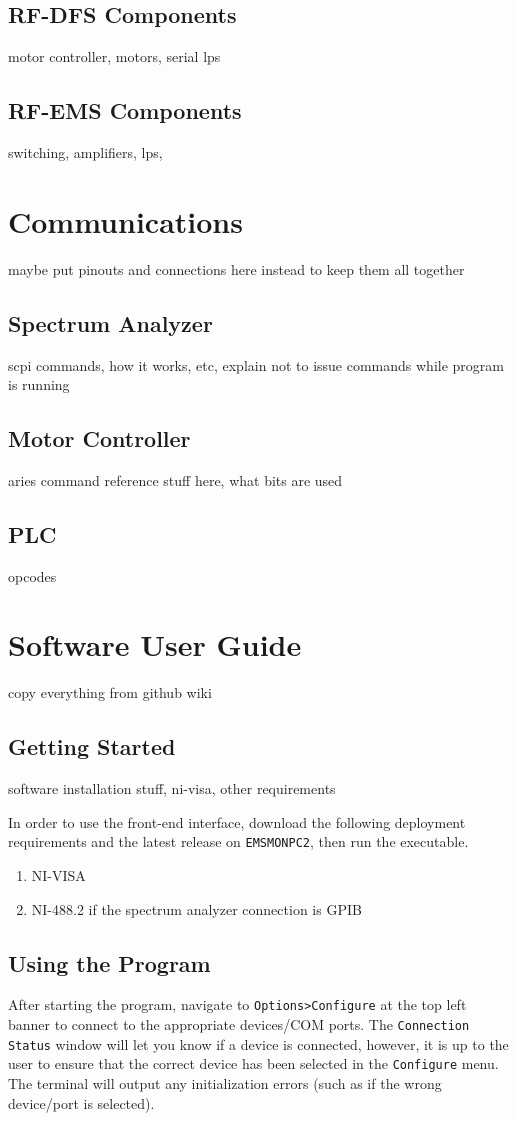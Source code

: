 \documentclass[titlepage]{article}
\begin{document}
\subsection{RF-DFS Components}
motor controller, motors, serial lps
\subsection{RF-EMS Components}
switching, amplifiers, lps,

\section{Communications}
maybe put pinouts and connections here instead to keep them all together
\subsection{Spectrum Analyzer}
scpi commands, how it works, etc, explain not to issue commands while program is running
\subsection{Motor Controller}
aries command reference stuff here, what bits are used
\subsection{PLC}
opcodes

\section{Software User Guide}
copy everything from github wiki
\subsection{Getting Started}
software installation stuff, ni-visa, other requirements

In order to use the front-end interface, download the following deployment requirements and the latest release on \verb|EMSMONPC2|, then run the executable.
\begin{enumerate}
  \item NI-VISA
  \item NI-488.2 if the spectrum analyzer connection is GPIB
\end{enumerate}

\subsection{Using the Program}
After starting the program, navigate to \verb|Options>Configure| at the top left banner to connect to the appropriate devices/COM ports. The \verb|Connection Status| window will let you know if a device is connected, however, it is up to the user to ensure that the correct device has been selected in the \verb|Configure| menu. The terminal will output any initialization errors (such as if the wrong device/port is selected).
\end{document}
